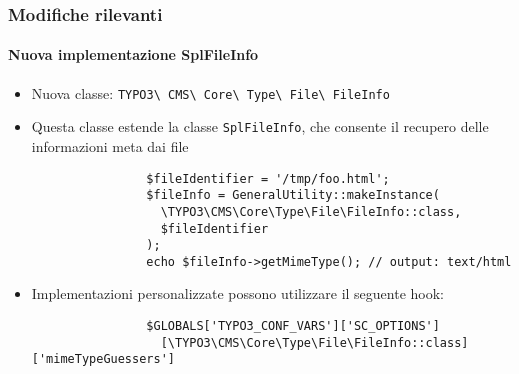 
\begin{frame}[fragile]
	\frametitle{Modifiche rilevanti}
	\framesubtitle{Nuova implementazione SplFileInfo}

	\lstset{basicstyle=\smaller\ttfamily}

	\begin{itemize}

		\item Nuova classe:
			\texttt{TYPO3\textbackslash
				CMS\textbackslash
				Core\textbackslash
				Type\textbackslash
				File\textbackslash
				FileInfo}

		\item Questa classe estende la classe \texttt{SplFileInfo}, che consente il recupero delle informazioni meta dai file

			\begin{lstlisting}
				$fileIdentifier = '/tmp/foo.html';
				$fileInfo = GeneralUtility::makeInstance(
				  \TYPO3\CMS\Core\Type\File\FileInfo::class,
				  $fileIdentifier
				);
				echo $fileInfo->getMimeType(); // output: text/html
			\end{lstlisting}

		\item Implementazioni personalizzate possono utilizzare il seguente hook:

			\begin{lstlisting}
				$GLOBALS['TYPO3_CONF_VARS']['SC_OPTIONS']
				  [\TYPO3\CMS\Core\Type\File\FileInfo::class]['mimeTypeGuessers']
			\end{lstlisting}

	\end{itemize}

\end{frame}


